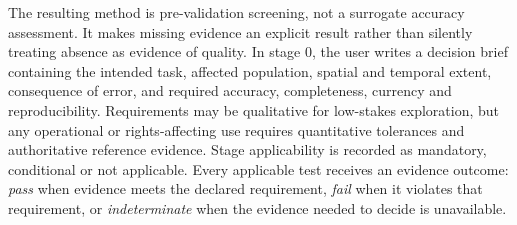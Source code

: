 \documentclass[pdflatex,sn-basic]{sn-jnl}
\begin{document}
The resulting method is pre-validation screening, not a surrogate accuracy assessment. It makes missing evidence an explicit result rather than silently treating absence as evidence of quality. In stage 0, the user writes a decision brief containing the intended task, affected population, spatial and temporal extent, consequence of error, and required accuracy, completeness, currency and reproducibility. Requirements may be qualitative for low-stakes exploration, but any operational or rights-affecting use requires quantitative tolerances and authoritative reference evidence. Stage applicability is recorded as mandatory, conditional or not applicable. Every applicable test receives an evidence outcome: \emph{pass} when evidence meets the declared requirement, \emph{fail} when it violates that requirement, or \emph{indeterminate} when the evidence needed to decide is unavailable.
\end{document}
